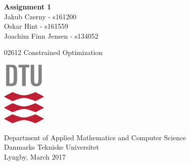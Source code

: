 
\begin{titlepage}
    
    
    \thispagestyle{empty}
    \begin{center}
      \vspace*{5cm}
      {\Huge \bf Assignment 1\\}
      \vspace*{0.5cm}
      {\large Jakub Czerny - s161200\\
              [2mm] Oskar Hint - s161559\\
              [2mm] Joachim Finn Jensen - s134052\\}
              
      \vspace*{9cm}
    
      {\Large 02612 Constrained Optimization}
      \vspace*{0.9cm}
      
       \begin{center}
       \includegraphics[scale=2.0]{DTU-logo-CMYK}
       \end{center}
    
    \vspace*{0.1cm}
      {\large Department of Applied Mathematics and Computer Science\\
              [2mm] Danmarks Tekniske Universitet\\
              [2mm] Lyngby, March 2017\\}
        
    \end{center}
\end{titlepage}
